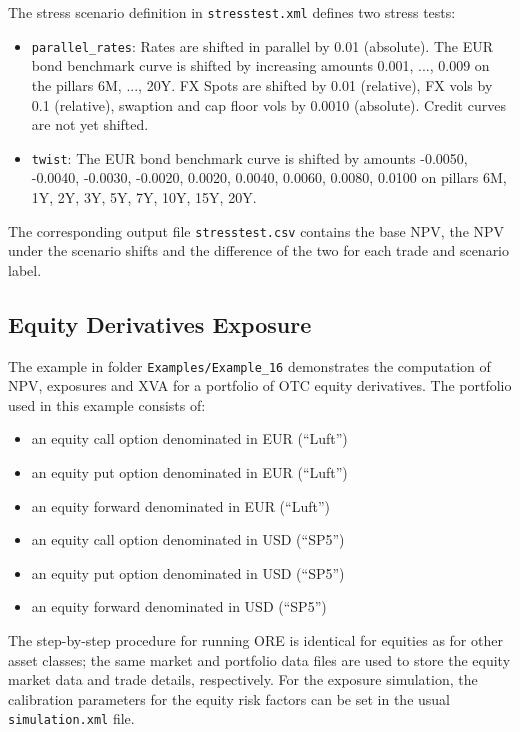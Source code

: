 \documentclass[12pt, a4paper]{article}
\begin{document}
The stress scenario definition in {\tt stresstest.xml} defines two stress tests:

\begin{itemize}
\item {\tt parallel\_rates}: Rates are shifted in parallel by 0.01 (absolute). The EUR bond benchmark curve is shifted by
  increasing amounts 0.001, ..., 0.009 on the pillars 6M, ..., 20Y. FX Spots are shifted by 0.01 (relative), FX vols by
  0.1 (relative), swaption and cap floor vols by 0.0010 (absolute).
  Credit curves are not yet shifted.
\item {\tt twist}: The EUR bond benchmark curve is shifted by amounts -0.0050, -0.0040, -0.0030, -0.0020, 0.0020,
  0.0040, 0.0060, 0.0080, 0.0100 on pillars 6M, 1Y, 2Y, 3Y, 5Y, 7Y, 10Y, 15Y, 20Y.
\end{itemize}

The corresponding output file {\tt stresstest.csv} contains the base NPV, the NPV under the scenario shifts and the
difference of the two for each trade and scenario label.


\subsection{Equity Derivatives Exposure}\label{ex:equityderivatives}

The example in folder {\tt Examples/Example\_16} demonstrates the computation of NPV, exposures and XVA for a portfolio 
of OTC equity derivatives. The portfolio used in this example consists of:

\begin{itemize}
	\item an equity call option denominated in EUR (``Luft'')
	\item an equity put option denominated in EUR (``Luft'')
	\item an equity forward denominated in EUR (``Luft'')
	\item an equity call option denominated in USD (``SP5'')
	\item an equity put option denominated in USD (``SP5'')
	\item an equity forward denominated in USD (``SP5'')
\end{itemize}

The step-by-step procedure for running ORE is identical for equities as for other asset classes; the same market and 
portfolio data files are used to store the equity market data and trade details, respectively. For the exposure 
simulation, the calibration parameters for the equity risk factors can be set in the usual {\tt simulation.xml} file.
\end{document}
